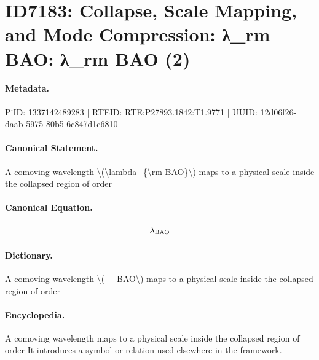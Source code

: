 \section*{ID7183: Collapse, Scale Mapping, and Mode Compression: λ\_rm BAO: λ\_rm BAO (2)}
\paragraph{Metadata.}
PiID: 1337142489283 | RTEID: RTE:P27893.1842:T1.9771 | UUID: 12d06f26-daab-5975-80b5-6c847d1c6810

\paragraph{Canonical Statement.}
A comoving wavelength \textbackslash{}(\textbackslash{}lambda\_\{\textbackslash{}rm BAO\}\textbackslash{}) maps to a physical scale inside the collapsed region of order

\paragraph{Canonical Equation.}
\[
\lambda_{\rm BAO}
\]

\paragraph{Dictionary.}
A comoving wavelength \textbackslash{}( \_ BAO\textbackslash{}) maps to a physical scale inside the collapsed region of order

\paragraph{Encyclopedia.}
A comoving wavelength maps to a physical scale inside the collapsed region of order It introduces a symbol or relation used elsewhere in the framework.
